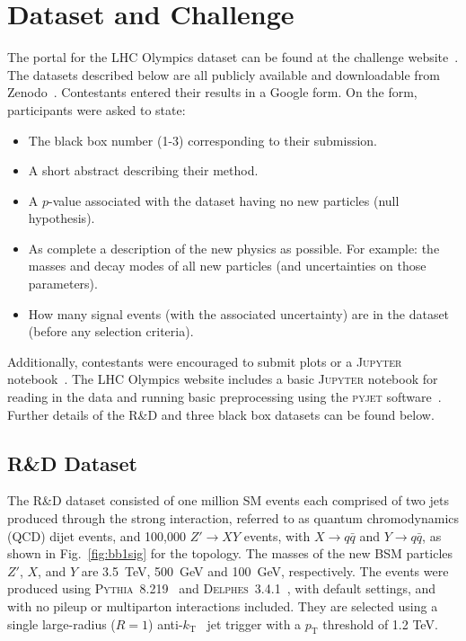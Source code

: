 \documentclass[a4paper,11pt]{article}
\begin{document}
\clearpage

\section{Dataset and Challenge}
\label{sec:challenge}


The portal for the LHC Olympics dataset can be found at the challenge website~\cite{lhco}.  The datasets described below are all publicly available and downloadable from Zenodo~\cite{lhc_bb1}.  Contestants entered their results in a Google form. On the form, participants were asked to state:

\begin{itemize}
    \item The black box number (1-3) corresponding to their submission.
    \item A short abstract describing their method.
    \item A $p$-value associated with the dataset having no new particles (null hypothesis).
    \item As complete a description of the new physics as possible. For example: the masses and decay modes of all new particles (and uncertainties on those parameters).
    \item How many signal events (with the associated uncertainty) are in the dataset (before any selection criteria).
\end{itemize}

Additionally, contestants were encouraged to submit plots or a \textsc{Jupyter} notebook~\cite{PER-GRA:2007}. The LHC Olympics website includes a basic \textsc{Jupyter} notebook for reading in the data and running basic preprocessing using the \textsc{pyjet} software~\cite{noel_dawe_2020_4289190,Cacciari:2011ma,Cacciari:2005hq}.  Further details of the R\&D and three black box datasets can be found below.

\subsection{R\&D Dataset}
\label{sec:challenge_rnd}

The R\&D dataset consisted of one million SM events each comprised of two jets produced through the strong interaction, referred to as quantum chromodynamics (QCD) dijet events, and 100,000 $Z'\to XY$ events, with $X\to q\bar q$ and $Y\to q\bar q$, as shown in Fig.~\ref{fig:bb1sig} for the topology.  The masses of the new BSM particles $Z'$, $X$, and $Y$ are 3.5~TeV, 500~GeV and 100~GeV, respectively. The events were produced using \textsc{Pythia}~8.219~\cite{Sjostrand:2006za,Sjostrand:2014zea} and \textsc{Delphes}~3.4.1~\cite{deFavereau:2013fsa,Mertens:2015kba,Selvaggi:2014mya}, with default settings, and with no pileup or multiparton interactions included. They are selected using a single large-radius ($R=1$) anti-$k_\mathrm{T}$~\cite{Cacciari:2008gp} jet trigger with a $p_\text{T}$ threshold of 1.2 TeV. 
\end{document}

